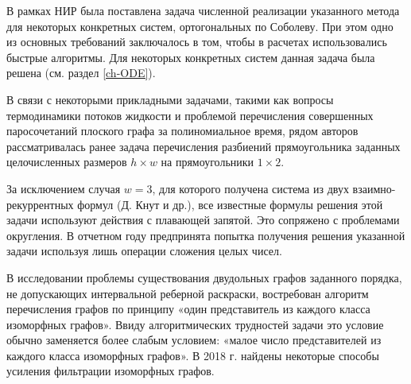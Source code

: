 В рамках НИР была поставлена задача численной реализации указанного метода для некоторых конкретных систем, ортогональных по Соболеву. При этом одно из основных требований заключалось в том, чтобы в расчетах использовались быстрые алгоритмы. Для некоторых конкретных систем данная задача была решена (см. раздел \ref{ch-ODE}). 














В связи с некоторыми прикладными задачами, такими как вопросы термодинамики потоков жидкости и проблемой перечисления совершенных паросочетаний плоского графа за полиномиальное время, рядом авторов рассматривалась ранее задача перечисления разбиений прямоугольника заданных целочисленных размеров $h\times w$ на прямоугольники $1\times 2$.

За исключением  случая $w=3$, для которого получена система из двух взаимно-рекуррентных формул (Д. Кнут и др.), все известные формулы решения этой задачи используют действия с плавающей запятой. Это сопряжено с проблемами округления.
%
В отчетном году предпринята попытка получения решения указанной задачи используя лишь операции сложения целых чисел.


В исследовании проблемы существования двудольных графов заданного порядка, не допускающих интервальной реберной раскраски, востребован алгоритм перечисления графов по принципу «один представитель из каждого класса изоморфных графов». Ввиду алгоритмических трудностей задачи это условие обычно заменяется более слабым условием: «малое число представителей из каждого класса изоморфных графов». В 2018 г. найдены некоторые способы усиления фильтрации изоморфных графов.

